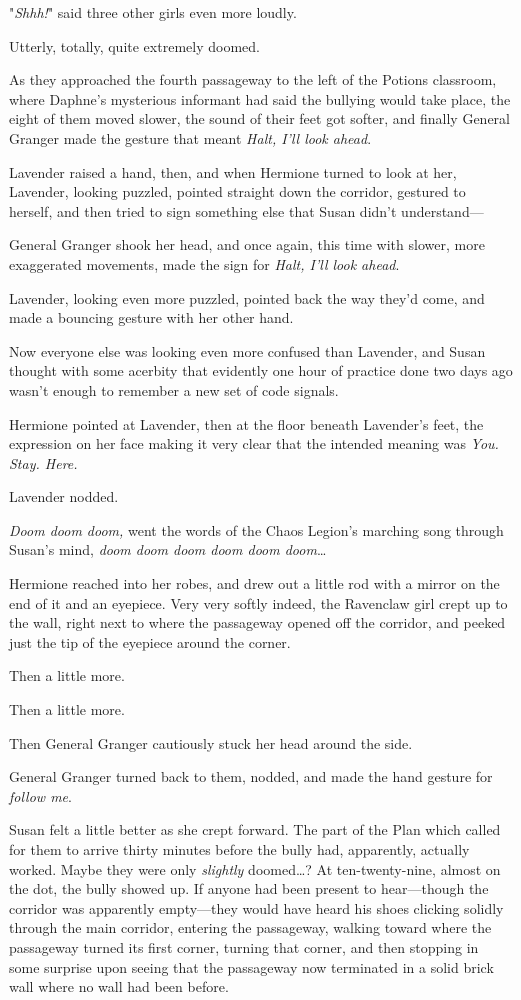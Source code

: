 "\emph{Shhh!}" said three other girls even more loudly.

Utterly, totally, quite extremely doomed.

As they approached the fourth passageway to the left of the Potions classroom, 
where Daphne's mysterious informant had said the bullying would take place, the 
eight of them moved slower, the sound of their feet got softer, and finally 
General Granger made the gesture that meant \emph{Halt, I'll look ahead}.

Lavender raised a hand, then, and when Hermione turned to look at her, 
Lavender, looking puzzled, pointed straight down the corridor, gestured to 
herself, and then tried to sign something else that Susan didn't understand---

General Granger shook her head, and once again, this time with slower, more 
exaggerated movements, made the sign for \emph{Halt, I'll look ahead}.

Lavender, looking even more puzzled, pointed back the way they'd come, and made 
a bouncing gesture with her other hand.

Now everyone else was looking even more confused than Lavender, and Susan 
thought with some acerbity that evidently one hour of practice done two days 
ago wasn't enough to remember a new set of code signals.

Hermione pointed at Lavender, then at the floor beneath Lavender's feet, the 
expression on her face making it very clear that the intended meaning was 
\emph{You. Stay. Here.}

Lavender nodded.

\emph{Doom doom doom,} went the words of the Chaos Legion's marching song 
through Susan's mind, \emph{doom doom doom doom doom doom}{\ldots}

Hermione reached into her robes, and drew out a little rod with a mirror on the 
end of it and an eyepiece. Very very softly indeed, the Ravenclaw girl crept up 
to the wall, right next to where the passageway opened off the corridor, and 
peeked just the tip of the eyepiece around the corner.

Then a little more.

Then a little more.

Then General Granger cautiously stuck her head around the side.

General Granger turned back to them, nodded, and made the hand gesture for 
\emph{follow me}.

Susan felt a little better as she crept forward. The part of the Plan which 
called for them to arrive thirty minutes before the bully had, apparently, 
actually worked. Maybe they were only \emph{slightly} doomed{\ldots}?
\sbreak
At ten-twenty-nine, almost on the dot, the bully showed up. If anyone had been 
present to hear---though the corridor was apparently empty---they would have 
heard his shoes clicking solidly through the main corridor, entering the 
passageway, walking toward where the passageway turned its first corner, 
turning that corner, and then stopping in some surprise upon seeing that the 
passageway now terminated in a solid brick wall where no wall had been before.

